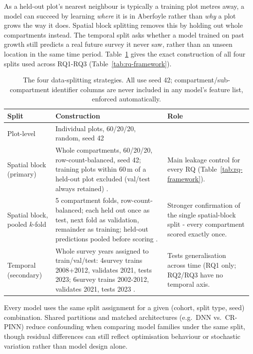 \documentclass[logo,msc,ai]{infthesis}           %
\begin{document}
As a held-out plot's nearest neighbour is typically a training plot metres away, a model can succeed by learning \emph{where} it is in Aberfoyle rather than \emph{why} a plot grows the way it does. Spatial block splitting removes this by holding out whole compartments instead. The temporal split asks whether a model trained on past growth still predicts a real future survey it never saw, rather than an unseen location in the same time period. Table~\ref{tab:splits-summary} gives the exact construction of all four splits used across RQ1-RQ3 (Table~\ref{tab:rq-framework}).

\begin{table}[!htbp]
\centering
\scriptsize
\renewcommand{\arraystretch}{1.2}
\begin{tabular}{p{2.1cm}p{5.1cm}p{5.3cm}}
\toprule
Split & Construction & Role \\
\midrule
Plot-level & Individual plots, 60/20/20, random, seed 42 \\
Spatial block (primary) & Whole compartments, 60/20/20, row-count-balanced, seed 42; training plots within 60\,m of a held-out plot excluded (val/test always retained) \cite{roberts2017Cross_C5_EVAL}. & Main leakage control for every RQ (Table~\ref{tab:rq-framework}). \\
Spatial block, pooled $k$-fold & 5 compartment folds, row-count-balanced; each held out once as test, next fold as validation, remainder as training; held-out predictions pooled before scoring \cite{ploton2020Spatial_C5_EVAL}. & Stronger confirmation of the single spatial-block split - every compartment scored exactly once. \\
Temporal (secondary) & Whole survey years assigned to train/val/test: 4survey trains 2008+2012, validates 2021, tests 2023; 6survey trains 2002-2012, validates 2021, tests 2023 \cite{lynch2025Digital_C4_NN}. & Tests generalisation across time (RQ1 only; RQ2/RQ3 have no temporal axis. \\
\bottomrule
\end{tabular}
\caption{The four data-splitting strategies. All use seed 42; compartment/sub-compartment
identifier columns are never included in any model's feature list, enforced automatically.}
\label{tab:splits-summary}
\end{table}

Every model uses the same split assignment for a given (cohort, split type, seed) combination. Shared partitions and matched architectures (e.g.\ DNN vs.\ CR-PINN) reduce confounding when comparing model families under the same split, though residual differences can still reflect optimisation behaviour or stochastic variation rather than model design alone.
\end{document}

